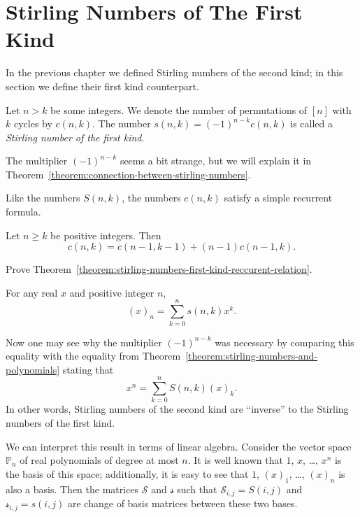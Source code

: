 \section{Stirling Numbers of The First Kind}
In the previous chapter we defined Stirling numbers of the second kind; in this
section we define their first kind counterpart.

\begin{definition}
  Let $n > k$ be some integers. We denote the number of permutations of $[n]$
  with $k$ cycles by $c(n, k)$. The number $s(n, k) = (-1)^{n - k} c(n, k)$ is
  called a \emph{Stirling number of the first kind}.
\end{definition}
The multiplier $(-1)^{n - k}$ seems a bit strange, but we will explain it
in Theorem~\ref{theorem:connection-between-stirling-numbers}.

Like the numbers $S(n, k)$, the numbers $c(n, k)$ satisfy a simple recurrent
formula.
\begin{theorem}
\label{theorem:stirling-numbers-first-kind-reccurent-relation}
  Let $n \ge k$ be positive integers. Then
  \[
    c(n, k) = c(n - 1, k - 1) + (n - 1) c(n - 1, k).
  \]
\end{theorem}

\begin{exercise}
  Prove Theorem~\ref{theorem:stirling-numbers-first-kind-reccurent-relation}.
\end{exercise}

\begin{theorem}
\label{theorem:connection-between-stirling-numbers}
  For any real $x$ and positive integer $n$,
  \[
    (x)_n = \sum_{k = 0}^n s(n, k) x^k.
  \]
\end{theorem}
Now one may see why the multiplier $(-1)^{n - k}$ was necessary by comparing
this equality with the equality from
Theorem~\ref{theorem:stirling-numbers-and-polynomials} stating that
\[
  x^n = \sum_{k = 0}^n S(n, k) (x)_k.
\]
In other words, Stirling numbers of the second kind are ``inverse'' to the
Stirling numbers of the first kind.

We can interpret this result in terms of linear algebra. Consider the vector
space $\mathbb{P}_n$ of real polynomials of degree at most $n$. It is well
known that $1$, $x$, \dots, $x^n$ is the basis of this space; additionally,
it is easy to see that $1$, $(x)_1$, \dots, $(x)_n$ is also a basis. Then
the matrices $\mathcal{S}$ and $\mathcal{s}$ such that
$\mathcal{S}_{i, j} = S(i, j)$ and $\mathcal{s}_{i, j} = s(i, j)$ are
change of basis matrices between these two bases.

